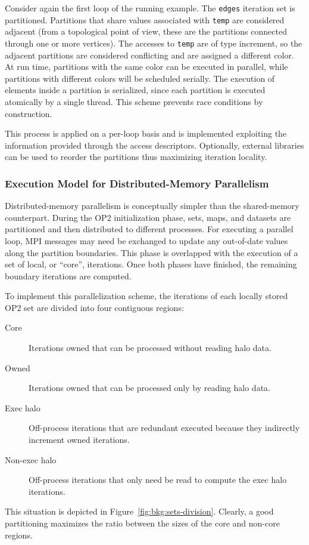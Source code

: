 Consider again the first loop of the running example. The {\tt edges} iteration set is partitioned. Partitions that share values associated with {\tt temp} are considered adjacent (from a topological point of view, these are the partitions connected through one or more vertices). The accesses to {\tt temp} are of type increment, so the adjacent partitions are considered conflicting and are assigned a different color. At run time, partitions with the same color can be executed in parallel, while partitions with different colors will be scheduled serially. The execution of elements inside a partition is serialized, since each partition is executed atomically by a single thread. This scheme prevents race conditions by construction. 

This process is applied on a per-loop basis and is implemented exploiting the information provided through the access descriptors. Optionally, external libraries can be used to reorder the partitions thus maximizing iteration locality. 

\subsubsection{Execution Model for Distributed-Memory Parallelism}
Distributed-memory parallelism is conceptually simpler than the shared-memory counterpart. During the OP2 initialization phase, sets, maps, and datasets are partitioned and then distributed to different processes. For executing a parallel loop, MPI messages may need be exchanged to update any out-of-date values along the partition boundaries. This phase is overlapped with the execution of a set of local, or ``core'', iterations. Once both phases have finished, the remaining boundary iterations are computed.

To implement this parallelization scheme, the iterations of each locally stored OP2 set are divided into four contiguous regions:
\begin{description}
\item[Core] Iterations owned that can be processed without reading halo data. 
\item[Owned] Iterations owned that can be processed only by reading halo data.
\item[Exec halo] Off-process iterations that are redundant executed because they indirectly increment owned iterations.
\item[Non-exec halo] Off-process iterations that only need be read to compute the exec halo iterations.
\end{description}
This situation is depicted in Figure~\ref{fig:bkg:sets-division}. Clearly, a good partitioning maximizes the ratio between the sizes of the core and non-core regions. 

